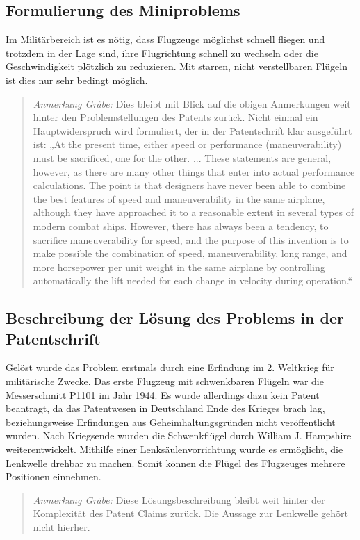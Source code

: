\documentclass[11pt,a4paper]{article}
\newcommand{\HGG}[1]{\begin{quote} \emph{Anmerkung Gräbe:} #1  \end{quote}}
\begin{document}
\subsection{Formulierung des Miniproblems}
Im Militärbereich ist es nötig, dass Flugzeuge möglichst schnell fliegen und
trotzdem in der Lage sind, ihre Flugrichtung schnell zu wechseln oder die
Geschwindigkeit plötzlich zu reduzieren. Mit starren, nicht verstellbaren
Flügeln ist dies nur sehr bedingt möglich.

\HGG{Dies bleibt mit Blick auf die obigen Anmerkungen weit hinter den
  Problemstellungen des Patents zurück. Nicht einmal ein Hauptwiderspruch wird
  formuliert, der in der Patentschrift klar ausgeführt ist: „At the present
  time, either speed or performance (maneuverability) must be sacrificed, one
  for the other. ...  These statements are general, however, as there are many
  other things that enter into actual performance calculations. The point is
  that designers have never been able to combine the best features of speed
  and maneuverability in the same airplane, although they have approached it
  to a reasonable extent in several types of modern combat ships.  However,
  there has always been a tendency, to sacrifice maneuverability for speed,
  and the purpose of this invention is to make possible the combination of
  speed, maneuverability, long range, and more horsepower per unit weight in
  the same airplane by controlling automatically the lift needed for each
  change in velocity during operation.“ }

\subsection{Beschreibung der Lösung des Problems in der Patentschrift}
Gelöst wurde das Problem erstmals durch eine Erfindung im 2. Weltkrieg für
militärische Zwecke. Das erste Flugzeug mit schwenkbaren Flügeln war die
Messerschmitt P1101 im Jahr 1944.  Es wurde allerdings dazu kein Patent
beantragt, da das Patentwesen in Deutschland Ende des Krieges brach lag,
beziehungsweise Erfindungen aus Geheimhaltungsgründen nicht veröffentlicht
wurden. Nach Kriegsende wurden die Schwenkflügel durch William J. Hampshire
weiterentwickelt. Mithilfe einer Lenksäulenvorrichtung wurde es ermöglicht,
die Lenkwelle drehbar zu machen. Somit können die Flügel des Flugzeuges
mehrere Positionen einnehmen.

\HGG{Diese Lösungsbeschreibung bleibt weit hinter der Komplexität des Patent
  Claims zurück.  Die Aussage zur Lenkwelle gehört nicht hierher.}
\end{document}
